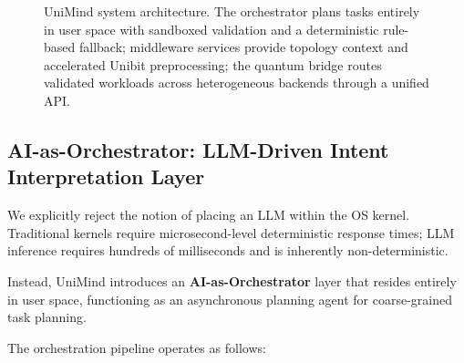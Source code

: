 ﻿\documentclass[12pt,a4paper]{article}
\begin{document}
\begin{figure}[t]
{}
\caption{UniMind system architecture. The orchestrator plans tasks entirely in user space with sandboxed validation and a deterministic rule-based fallback; middleware services provide topology context and accelerated Unibit preprocessing; the quantum bridge routes validated workloads across heterogeneous backends through a unified API.}
\label{fig:architecture}
\end{figure}

\subsection{AI-as-Orchestrator: LLM-Driven Intent Interpretation Layer}\label{sec:orchestrator}

We explicitly reject the notion of placing an LLM within the OS kernel. Traditional kernels require microsecond-level deterministic response times; LLM inference requires hundreds of milliseconds and is inherently non-deterministic.

Instead, UniMind introduces an \textbf{AI-as-Orchestrator} layer that resides entirely in user space, functioning as an asynchronous planning agent for coarse-grained task planning.

The orchestration pipeline operates as follows:
\end{document}
